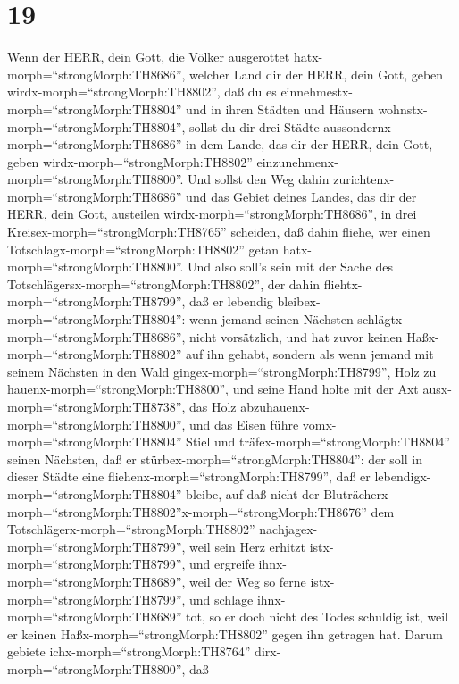 \hypertarget{section-18}{%
\section{19}\label{section-18}}

 Wenn der HERR, dein Gott, die Völker ausgerottet
hatx-morph=``strongMorph:TH8686'', welcher Land dir der HERR, dein Gott,
geben wirdx-morph=``strongMorph:TH8802'', daß du es
einnehmestx-morph=``strongMorph:TH8804'' und in ihren Städten und
Häusern wohnstx-morph=``strongMorph:TH8804'',  sollst du dir
drei Städte aussondernx-morph=``strongMorph:TH8686'' in dem Lande, das
dir der HERR, dein Gott, geben wirdx-morph=``strongMorph:TH8802''
einzunehmenx-morph=``strongMorph:TH8800''.  Und sollst den
Weg dahin zurichtenx-morph=``strongMorph:TH8686'' und das Gebiet deines
Landes, das dir der HERR, dein Gott, austeilen
wirdx-morph=``strongMorph:TH8686'', in drei
Kreisex-morph=``strongMorph:TH8765'' scheiden, daß dahin fliehe, wer
einen Totschlagx-morph=``strongMorph:TH8802'' getan
hatx-morph=``strongMorph:TH8800''.  Und also soll's sein mit
der Sache des Totschlägersx-morph=``strongMorph:TH8802'', der dahin
fliehtx-morph=``strongMorph:TH8799'', daß er lebendig
bleibex-morph=``strongMorph:TH8804'': wenn jemand seinen Nächsten
schlägtx-morph=``strongMorph:TH8686'', nicht vorsätzlich, und hat zuvor
keinen Haßx-morph=``strongMorph:TH8802'' auf ihn gehabt, 
sondern als wenn jemand mit seinem Nächsten in den Wald
gingex-morph=``strongMorph:TH8799'', Holz zu
hauenx-morph=``strongMorph:TH8800'', und seine Hand holte mit der Axt
ausx-morph=``strongMorph:TH8738'', das Holz
abzuhauenx-morph=``strongMorph:TH8800'', und das Eisen führe
vomx-morph=``strongMorph:TH8804'' Stiel und
träfex-morph=``strongMorph:TH8804'' seinen Nächsten, daß er
stürbex-morph=``strongMorph:TH8804'': der soll in dieser Städte eine
fliehenx-morph=``strongMorph:TH8799'', daß er
lebendigx-morph=``strongMorph:TH8804'' bleibe,  auf daß
nicht der
Bluträcherx-morph=``strongMorph:TH8802''x-morph=``strongMorph:TH8676''
dem Totschlägerx-morph=``strongMorph:TH8802''
nachjagex-morph=``strongMorph:TH8799'', weil sein Herz erhitzt
istx-morph=``strongMorph:TH8799'', und ergreife
ihnx-morph=``strongMorph:TH8689'', weil der Weg so ferne
istx-morph=``strongMorph:TH8799'', und schlage
ihnx-morph=``strongMorph:TH8689'' tot, so er doch nicht des Todes
schuldig ist, weil er keinen Haßx-morph=``strongMorph:TH8802'' gegen ihn
getragen hat.  Darum gebiete
ichx-morph=``strongMorph:TH8764'' dirx-morph=``strongMorph:TH8800'', daß
